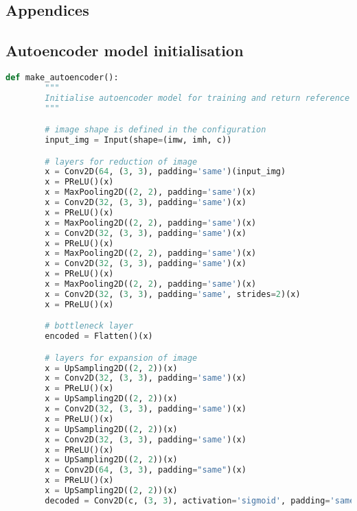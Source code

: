 \documentclass{l4proj}
\begin{document}
\begin{appendices}

\chapter{Appendices}

\section{Autoencoder model initialisation}

\begin{lstlisting}[language=python, float, caption={Keras code for initialising the autoencoder model developed here. It contains 5 downsampling and upsampling operations. It returns both its encoder and decoder parts. The decoder is used to evaluate the performance of the autoencoder at image reconstruction. The encoder is used to encode images to project them onto a two-dimensional plane using t-SNE and UMAP, and is also the building block for our regression model.}, label=lst:autoencoder]
    def make_autoencoder():
        """
        Initialise autoencoder model for training and return reference to both decoder and encoder parts of the model.
        """

        # image shape is defined in the configuration
        input_img = Input(shape=(imw, imh, c))

        # layers for reduction of image
        x = Conv2D(64, (3, 3), padding='same')(input_img)
        x = PReLU()(x)
        x = MaxPooling2D((2, 2), padding='same')(x)
        x = Conv2D(32, (3, 3), padding='same')(x)
        x = PReLU()(x)
        x = MaxPooling2D((2, 2), padding='same')(x)
        x = Conv2D(32, (3, 3), padding='same')(x)
        x = PReLU()(x)
        x = MaxPooling2D((2, 2), padding='same')(x)
        x = Conv2D(32, (3, 3), padding='same')(x)
        x = PReLU()(x)
        x = MaxPooling2D((2, 2), padding='same')(x)
        x = Conv2D(32, (3, 3), padding='same', strides=2)(x)
        x = PReLU()(x)

        # bottleneck layer
        encoded = Flatten()(x)

        # layers for expansion of image
        x = UpSampling2D((2, 2))(x)
        x = Conv2D(32, (3, 3), padding='same')(x)
        x = PReLU()(x)
        x = UpSampling2D((2, 2))(x)
        x = Conv2D(32, (3, 3), padding='same')(x)
        x = PReLU()(x)
        x = UpSampling2D((2, 2))(x)
        x = Conv2D(32, (3, 3), padding='same')(x)
        x = PReLU()(x)
        x = UpSampling2D((2, 2))(x)
        x = Conv2D(64, (3, 3), padding="same")(x)
        x = PReLU()(x)
        x = UpSampling2D((2, 2))(x)
        decoded = Conv2D(c, (3, 3), activation='sigmoid', padding='same')(x)


\end{lstlisting}
\end{appendices}
\end{document}
